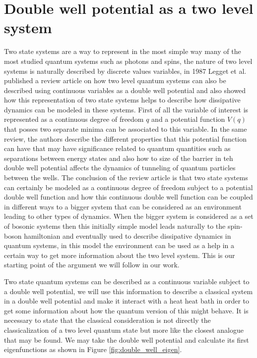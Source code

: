 \section{Double well potential as a two level system}
Two state systems are a way to represent in the most simple way many of the most studied quantum systems such as photons and spins, the nature of two level systems is naturally described by discrete values variables, in 1987 Legget et al. \cite{leggett1987dynamics} published a review article on how two level quantum systems can also be described using continuous variables as a double well potential and also showed how this representation of two state systems helps to describe how dissipative dynamics can be modeled in these systems. First of all the variable of interest is represented as a continuous degree of freedom $q$ and a potential function $V(q)$ that posses two separate minima can be associated to this variable. In the same review, the authors describe the different properties that this potential function can have that may have significance related to quantum quantities such as separations between energy states and also how to size of the barrier in teh double well potential affects the dynamics of tunneling of quantum particles between the wells. The conclusion of the review article is that two state systems can certainly be modeled as a continuous degree of freedom subject to a potential double well function and how this continuous double well function can be coupled in different ways to a bigger system that can be considered as an environment leading to other types of dynamics. When the bigger system is considered as a set of bosonic systems then this initially simple model leads naturally to the spin-boson hamiltonian and eventually used to describe dissipative dynamics in quantum systems, in this model the environment can be used as a help in a certain way to get more information about the two level system. This is our starting point of the argument we will follow in our work.\par 

Two state quantum systems can be described as a continuous variable subject to a double well potential, we will use this information to describe a classical system in a double well potential and make it interact with a heat  heat bath in order to get some information about how the quantum version of this might behave. It is necessary to state that the classical consideration is not directly the classicalization of a two level quantum state but more like the closest analogue that may be found. We may take the double well potential and calculate its first eigenfunctions as shown in Figure \ref{fig:double_well_eigen}.

